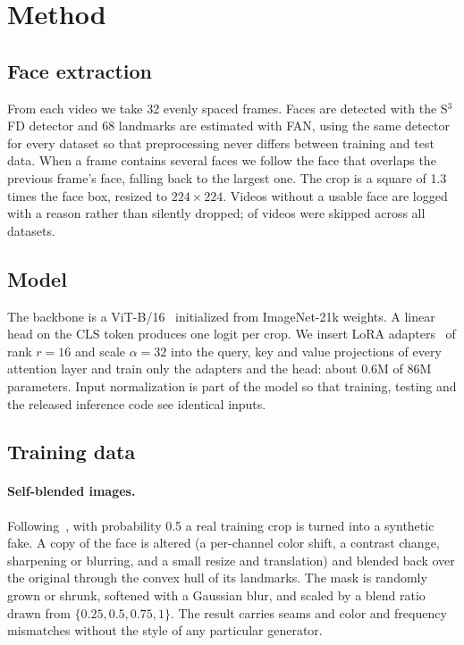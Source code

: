 \section{Method}

\subsection{Face extraction}
From each video we take 32 evenly spaced frames. Faces are detected with the S$^3$FD detector
and 68 landmarks are estimated with FAN, using the same detector for every dataset so that
preprocessing never differs between training and test data. When a frame contains several faces
we follow the face that overlaps the previous frame's face, falling back to the largest one. The
crop is a square of 1.3 times the face box, resized to $224\times224$. Videos without a usable
face are logged with a reason rather than silently dropped;  of  videos were
skipped across all datasets.

\subsection{Model}
The backbone is a ViT-B/16~\citep{dosovitskiy2021vit} initialized from ImageNet-21k
weights. A linear head on the CLS token produces one logit per crop. We insert LoRA
adapters~\citep{hu2022lora} of rank $r=16$ and scale $\alpha=32$ into the query, key and value
projections of every attention layer and train only the adapters and the head: about 0.6M of
86M parameters. Input normalization is part of the model so that training, testing and the
released inference code see identical inputs.

\subsection{Training data}
\paragraph{Self-blended images.} Following~\citet{shiohara2022sbi}, with probability 0.5 a real
training crop is turned into a synthetic fake. A copy of the face is altered (a per-channel
color shift, a contrast change, sharpening or blurring, and a small resize and translation) and
blended back over the original through the convex hull of its landmarks. The mask is randomly
grown or shrunk, softened with a Gaussian blur, and scaled by a blend ratio drawn from
$\{0.25, 0.5, 0.75, 1\}$. The result carries seams and color and frequency mismatches without
the style of any particular generator.

